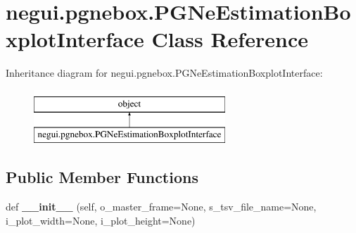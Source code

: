 \hypertarget{classnegui_1_1pgnebox_1_1PGNeEstimationBoxplotInterface}{}\section{negui.\+pgnebox.\+P\+G\+Ne\+Estimation\+Boxplot\+Interface Class Reference}
\label{classnegui_1_1pgnebox_1_1PGNeEstimationBoxplotInterface}
Inheritance diagram for negui.\+pgnebox.\+P\+G\+Ne\+Estimation\+Boxplot\+Interface\+:\begin{figure}[H]
\begin{center}
\leavevmode
\includegraphics[height=2.000000cm]{classnegui_1_1pgnebox_1_1PGNeEstimationBoxplotInterface}
\end{center}
\end{figure}
\subsection*{Public Member Functions}
\begin{DoxyCompactItemize}
\item 
def {\bfseries \+\_\+\+\_\+init\+\_\+\+\_\+} (self, o\+\_\+master\+\_\+frame=None, s\+\_\+tsv\+\_\+file\+\_\+name=None, i\+\_\+plot\+\_\+width=None, i\+\_\+plot\+\_\+height=None)\hypertarget{classnegui_1_1pgnebox_1_1PGNeEstimationBoxplotInterface_ad4cc251c76f8f47520ba05aac6997001}{}\label{classnegui_1_1pgnebox_1_1PGNeEstimationBoxplotInterface_ad4cc251c76f8f47520ba05aac6997001}

\end{DoxyCompactItemize}
